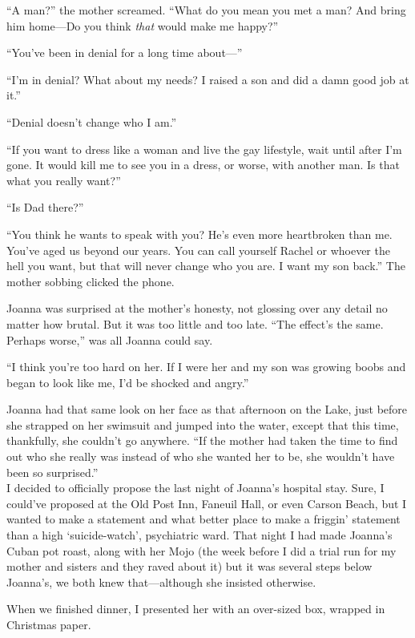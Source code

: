 ``A man?'' the mother screamed. ``What do you mean you met a man? And
bring him home---Do you think \emph{that} would make me happy?''

``You've been in denial for a long time about---''

``I'm in denial? What about my needs? I raised a son and did a damn good
job at it.''

``Denial doesn't change who I am.''

``If you want to dress like a woman and live the gay lifestyle, wait
until after I'm gone. It would kill me to see you in a dress, or worse,
with another man. Is that what you really want?''

``Is Dad there?''

``You think he wants to speak with you? He's even more heartbroken than
me. You've aged us beyond our years. You can call yourself Rachel or
whoever the hell you want, but that will never change who you are. I
want my son back.'' The mother sobbing clicked the phone.

Joanna was surprised at the mother's honesty, not glossing over any
detail no matter how brutal. But it was too little and too late. ``The
effect's the same. Perhaps worse,'' was all Joanna could say.

``I think you're too hard on her. If I were her and my son was growing
boobs and began to look like me, I'd be shocked and angry.''

Joanna had that same look on her face as that afternoon on the Lake,
just before she strapped on her swimsuit and jumped into the water,
except that this time, thankfully, she couldn't go anywhere. ``If the
mother had taken the time to find out who she really was instead of who
she wanted her to be, she wouldn't have been so surprised.''\\

I decided to officially propose the last night of Joanna's hospital
stay. Sure, I could've proposed at the Old Post Inn, Faneuil Hall, or
even Carson Beach, but I wanted to make a statement and what better
place to make a friggin' statement than a high `suicide-watch',
psychiatric ward. That night I had made Joanna's Cuban pot roast, along
with her Mojo (the week before I did a trial run for my mother and
sisters and they raved about it) but it was several steps below
Joanna's, we both knew that---although she insisted otherwise.

When we finished dinner, I presented her with an over-sized box, wrapped
in Christmas paper.

